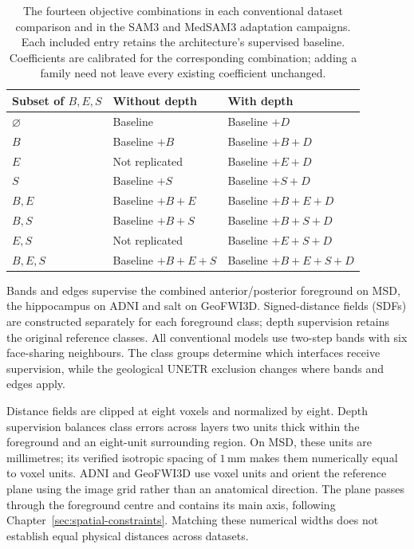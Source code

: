 \documentclass[12pt,a4paper]{article}
\begin{document}
\begin{table}[htbp]
\centering
\small
{}
\renewcommand{\arraystretch}{1.2}
\begin{tabular}{@{}P{4.6cm}P{4.6cm}P{4.6cm}@{}}
\hline
Subset of $B,E,S$ & Without depth & With depth \\
\hline
$\varnothing$ & Baseline & Baseline $+D$ \\
$B$ & Baseline $+B$ & Baseline $+B+D$ \\
$E$ & Not replicated & Baseline $+E+D$ \\
$S$ & Baseline $+S$ & Baseline $+S+D$ \\
$B,E$ & Baseline $+B+E$ & Baseline $+B+E+D$ \\
$B,S$ & Baseline $+B+S$ & Baseline $+B+S+D$ \\
$E,S$ & Not replicated & Baseline $+E+S+D$ \\
$B,E,S$ & Baseline $+B+E+S$ & Baseline $+B+E+S+D$ \\
\hline
\end{tabular}
\caption{The fourteen objective combinations in each conventional dataset
comparison and in the SAM3 and MedSAM3 adaptation campaigns.
Each included entry retains the architecture's supervised
baseline. Coefficients are calibrated for the corresponding combination;
adding a family need not leave every existing coefficient unchanged.}
\label{tab:constraint-combinations}
\end{table}

Bands and edges supervise the combined anterior/posterior foreground
on MSD, the hippocampus on ADNI and salt on GeoFWI3D. Signed-distance
fields (SDFs) are constructed separately for each foreground class;
depth supervision retains the original reference classes. All
conventional models use two-step bands with six face-sharing neighbours.
The class groups determine which interfaces receive supervision, while
the geological UNETR exclusion changes where bands and edges apply.

Distance fields are clipped at eight voxels and normalized by eight.
Depth supervision balances class errors across layers two units thick
within the foreground and an eight-unit surrounding region. On MSD,
these units are millimetres; its verified isotropic spacing of
$1\,\mathrm{mm}$ makes them numerically equal to voxel units. ADNI and
GeoFWI3D use voxel units and orient the reference plane using the
image grid rather than an anatomical direction. The plane passes
through the foreground centre and contains its main axis, following
Chapter~\ref{sec:spatial-constraints}. Matching these numerical widths
does not establish equal physical distances across datasets.
\end{document}

